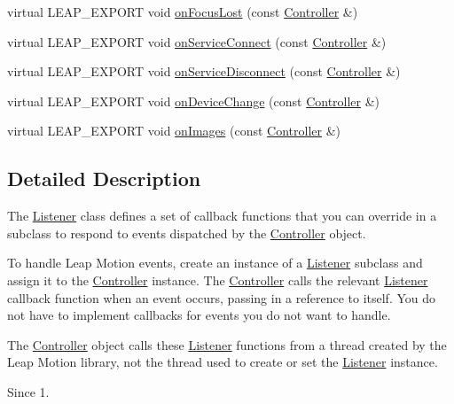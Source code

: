 \begin{DoxyCompactItemize}
virtual L\+E\+A\+P\+\_\+\+E\+X\+P\+O\+RT void \hyperlink{class_leap_1_1_listener_a7bcae44a40674c3f1e367b911201d252}{on\+Focus\+Lost} (const \hyperlink{class_leap_1_1_controller}{Controller} \&)
\item 
virtual L\+E\+A\+P\+\_\+\+E\+X\+P\+O\+RT void \hyperlink{class_leap_1_1_listener_aa9cc3f35ba72e58dc45cac415b9253f7}{on\+Service\+Connect} (const \hyperlink{class_leap_1_1_controller}{Controller} \&)
\item 
virtual L\+E\+A\+P\+\_\+\+E\+X\+P\+O\+RT void \hyperlink{class_leap_1_1_listener_a894976a7ff7a101a08c9b88a43ec367b}{on\+Service\+Disconnect} (const \hyperlink{class_leap_1_1_controller}{Controller} \&)
\item 
virtual L\+E\+A\+P\+\_\+\+E\+X\+P\+O\+RT void \hyperlink{class_leap_1_1_listener_adb6de7817e0b316b82f781a03aae5448}{on\+Device\+Change} (const \hyperlink{class_leap_1_1_controller}{Controller} \&)
\item 
virtual L\+E\+A\+P\+\_\+\+E\+X\+P\+O\+RT void \hyperlink{class_leap_1_1_listener_a2c2f4e7729f19f6fd70b71c781e4c95c}{on\+Images} (const \hyperlink{class_leap_1_1_controller}{Controller} \&)
\end{DoxyCompactItemize}


\subsection{Detailed Description}
The \hyperlink{class_leap_1_1_listener}{Listener} class defines a set of callback functions that you can override in a subclass to respond to events dispatched by the \hyperlink{class_leap_1_1_controller}{Controller} object.

To handle Leap Motion events, create an instance of a \hyperlink{class_leap_1_1_listener}{Listener} subclass and assign it to the \hyperlink{class_leap_1_1_controller}{Controller} instance. The \hyperlink{class_leap_1_1_controller}{Controller} calls the relevant \hyperlink{class_leap_1_1_listener}{Listener} callback function when an event occurs, passing in a reference to itself. You do not have to implement callbacks for events you do not want to handle.

The \hyperlink{class_leap_1_1_controller}{Controller} object calls these \hyperlink{class_leap_1_1_listener}{Listener} functions from a thread created by the Leap Motion library, not the thread used to create or set the \hyperlink{class_leap_1_1_listener}{Listener} instance. \begin{DoxySince}{Since}
1. 
\end{DoxySince}



